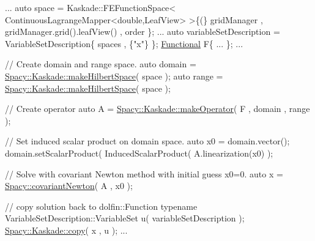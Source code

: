 \begin{DoxyCode}
...
auto space = Kaskade::FEFunctionSpace< ContinuousLagrangeMapper<double,LeafView> >\{(\} gridManager , 
      gridManager.grid().leafView() , order \};
...
auto variableSetDescription = VariableSetDescription\{ spaces , \{\textcolor{stringliteral}{"x"}\} \};
\hyperlink{group__SpacyGroup_ga673218f603c93790864aef12c89d3a35_ga673218f603c93790864aef12c89d3a35}{Functional} F\{ ... \};
...

\textcolor{comment}{// Create domain and range space.}
auto domain = \hyperlink{group__KaskadeGroup_ga04d45446864bbf87770d02eade7b64cf_ga04d45446864bbf87770d02eade7b64cf}{Spacy::Kaskade::makeHilbertSpace}( space );
\textcolor{keyword}{auto} range  = \hyperlink{group__KaskadeGroup_ga04d45446864bbf87770d02eade7b64cf_ga04d45446864bbf87770d02eade7b64cf}{Spacy::Kaskade::makeHilbertSpace}( space );

\textcolor{comment}{// Create operator}
\textcolor{keyword}{auto} A = \hyperlink{group__KaskadeGroup_ga0e8d7d2c51e429e22561ef813fc97589_ga0e8d7d2c51e429e22561ef813fc97589}{Spacy::Kaskade::makeOperator}( F , domain , range );

\textcolor{comment}{// Set induced scalar product on domain space.}
\textcolor{keyword}{auto} x0 = domain.vector();
domain.setScalarProduct( InducedScalarProduct( A.linearization(x0) );

\textcolor{comment}{// Solve with covariant Newton method with initial guess x0=0.}
\textcolor{keyword}{auto} x = \hyperlink{group__NewtonGroup_gab9d1c5b64e93d7ac051f8a7b41bf520a_gab9d1c5b64e93d7ac051f8a7b41bf520a}{Spacy::covariantNewton}( A , x0 );


\textcolor{comment}{// copy solution back to dolfin::Function}
\textcolor{keyword}{typename} VariableSetDescription::VariableSet u( variableSetDescription );
\hyperlink{group__KaskadeGroup_gafbbd7e385eda54f651c45b1c074d7bf9_gafbbd7e385eda54f651c45b1c074d7bf9}{Spacy::Kaskade::copy}( x , u );
...
\end{DoxyCode}
 